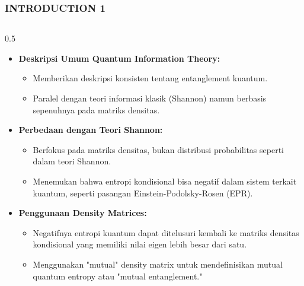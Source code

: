 


\begin{frame}
    \frametitle{INTRODUCTION 1}
       \vspace*{-0.5cm}
  \begin{columns}[T]
  \small
    \begin{column}{0.5\textwidth}
        \begin{itemize}\tiny \justifying
            \item \textbf{Deskripsi Umum Quantum Information Theory:}
            \begin{itemize}\tiny \justifying
            \item Memberikan deskripsi konsisten tentang entanglement kuantum.
            \item Paralel dengan teori informasi klasik (Shannon) namun berbasis sepenuhnya pada matriks densitas.
            \end{itemize}
            
            \item \textbf{Perbedaan dengan Teori Shannon:}
            \begin{itemize}\tiny \justifying
            \item Berfokus pada matriks densitas, bukan distribusi probabilitas seperti dalam teori Shannon.
            \item Menemukan bahwa entropi kondisional bisa negatif dalam sistem terkait kuantum, seperti pasangan Einstein-Podolsky-Rosen (EPR).
            \end{itemize}
            
            \item \textbf{Penggunaan Density Matrices:}
            \begin{itemize}\tiny \justifying
            \item Negatifnya entropi kuantum dapat ditelusuri kembali ke matriks densitas kondisional yang memiliki nilai eigen lebih besar dari satu.
            \item Menggunakan "mutual" density matrix untuk mendefinisikan mutual quantum entropy atau "mutual entanglement."
            \end{itemize}

        \end{itemize}
    \end{column}


\end{columns}
\end{frame}
